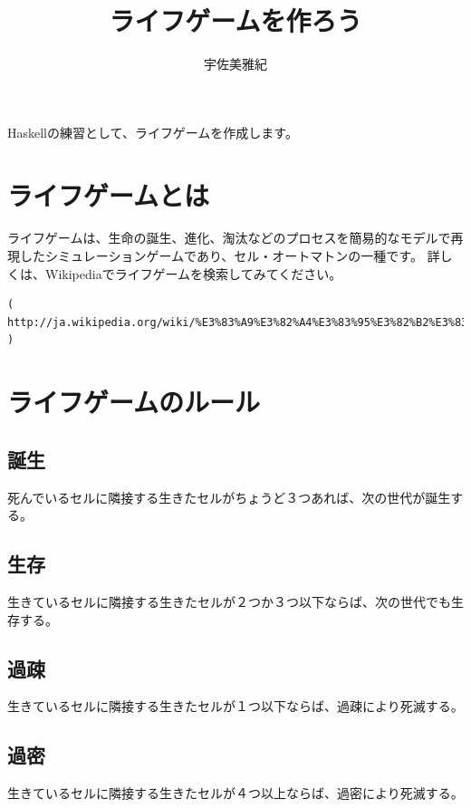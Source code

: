 \documentclass{jsarticle}
\begin{document}
\title{ライフゲームを作ろう}
\author{宇佐美雅紀}
\maketitle

Haskellの練習として、ライフゲームを作成します。

\section{ライフゲームとは}
ライフゲームは、生命の誕生、進化、淘汰などのプロセスを簡易的なモデルで再現したシミュレーションゲームであり、セル・オートマトンの一種です。
詳しくは、Wikipediaでライフゲームを検索してみてください。
\begin{verbatim}
( http://ja.wikipedia.org/wiki/%E3%83%A9%E3%82%A4%E3%83%95%E3%82%B2%E3%83%BC%E3%83%A0 )
\end{verbatim}

\section{ライフゲームのルール}
\subsection*{誕生}
死んでいるセルに隣接する生きたセルがちょうど３つあれば、次の世代が誕生する。

\subsection*{生存}
生きているセルに隣接する生きたセルが２つか３つ以下ならば、次の世代でも生存する。

\subsection*{過疎}
生きているセルに隣接する生きたセルが１つ以下ならば、過疎により死滅する。

\subsection*{過密}
生きているセルに隣接する生きたセルが４つ以上ならば、過密により死滅する。
\end{document}

